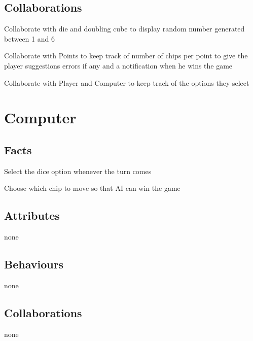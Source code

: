 \documentclass{report}
\begin{document}
\subsection{Collaborations}

\begin{dashed}
    \item Collaborate with die and doubling cube to display random number generated between 1 and 6
    \item Collaborate with Points to keep track of number of chips per point to give the player suggestions errors if any and a notification when he wins the game
    \item Collaborate with Player and Computer to keep track of the options they select
\end{dashed}

\section{Computer}

\subsection{Facts}

\begin{dashed}
    \item Select the dice option whenever the turn comes
    \item Choose which chip to move so that AI can win the game
\end{dashed}

\subsection{Attributes}

\begin{dashed}
    \item none
\end{dashed}

\subsection{Behaviours}

\begin{dashed}
    \item none
\end{dashed}

\subsection{Collaborations}

\begin{dashed}
    \item none
\end{dashed}
\end{document}
